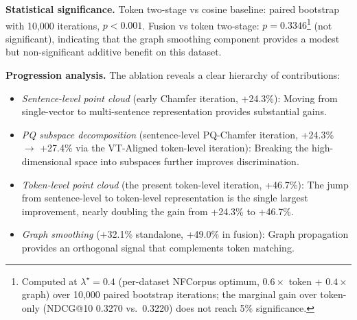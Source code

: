 \documentclass[review,1p]{elsarticle}
\begin{document}
\begin{table}[ht]
\centering
\caption{NFCorpus ablation (NDCG@10).}
\label{tab:ablation}
\end{table}

\textbf{Statistical significance.} Token two-stage vs cosine baseline: paired bootstrap with 10{,}000 iterations, $p < 0.001$. Fusion vs token two-stage: $p = 0.3346$\footnote{Computed at $\lambda^\star=0.4$ (per-dataset NFCorpus optimum, $0.6 \times$ token + $0.4 \times$ graph) over 10,000 paired bootstrap iterations; the marginal gain over token-only (NDCG@10 0.3270 vs.\ 0.3220) does not reach 5\% significance.} (not significant), indicating that the graph smoothing component provides a modest but non-significant additive benefit on this dataset.

\textbf{Progression analysis.} The ablation reveals a clear hierarchy of contributions:
\begin{itemize}[leftmargin=*]
\item \textit{Sentence-level point cloud} (early Chamfer iteration, +24.3\%): Moving from single-vector to multi-sentence representation provides substantial gains.
\item \textit{PQ subspace decomposition} (sentence-level PQ-Chamfer iteration, +24.3\% $\to$ +27.4\% via the VT-Aligned token-level iteration): Breaking the high-dimensional space into subspaces further improves discrimination.
\item \textit{Token-level point cloud} (the present token-level iteration, +46.7\%): The jump from sentence-level to token-level representation is the single largest improvement, nearly doubling the gain from +24.3\% to +46.7\%.
\item \textit{Graph smoothing} (+32.1\% standalone, +49.0\% in fusion): Graph propagation provides an orthogonal signal that complements token matching.
\end{itemize}
\end{document}
